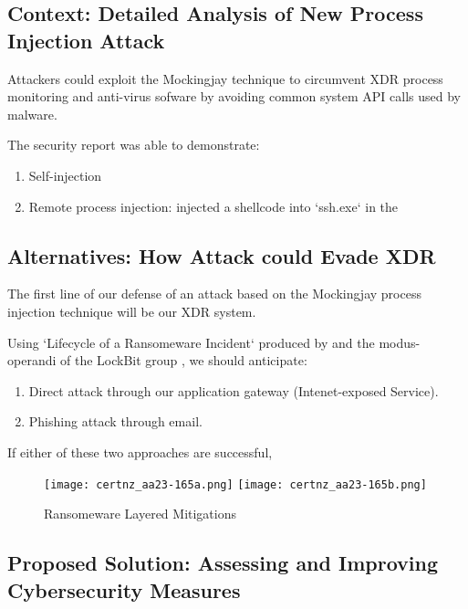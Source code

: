 \subsection{Context: Detailed Analysis of New Process Injection Attack}

Attackers could exploit the Mockingjay technique to circumvent XDR process monitoring and anti-virus sofware by avoiding
common system API calls used by malware.  

The security report was able to demonstrate:

\begin{enumerate}
\item Self-injection
\item Remote process injection: injected a shellcode into `ssh.exe` in the
\end{enumerate}

\subsection{Alternatives: How Attack could Evade XDR}

The first line of our defense of an attack based on the Mockingjay process injection technique will be our XDR system.

Using `Lifecycle of a Ransomeware Incident` produced by \autocite{Certnz:2021} and the modus-operandi of the LockBit
group \autocite{CISA:2023}, we should anticipate:

\begin{enumerate}
\item Direct attack through our application gateway (Intenet-exposed Service).
\item Phishing attack through email.
\end{enumerate}

If either of these two approaches are successful, 

\begin{figure}[ht]
\texttt{[image: certnz\_aa23-165a.png]}
\texttt{[image: certnz\_aa23-165b.png]}
\caption{Ransomeware Layered Mitigations \autocite{Certnz:2021}}
\end{figure}

\pagebreak

\subsection{Proposed Solution: Assessing and Improving Cybersecurity Measures}


